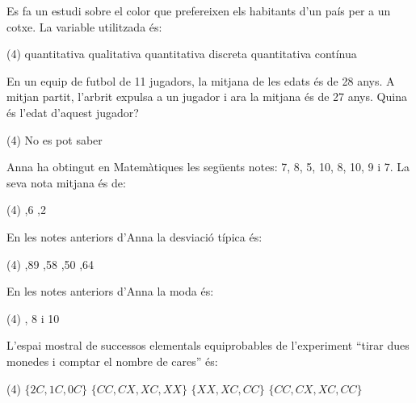 \pagebreak

\begin{autoaval}{51}
\begin{mylist}
 \exer[2] Es fa un estudi sobre el color que prefereixen els habitants d'un país per a un cotxe. La variable utilitzada és:
\begin{tasks}(4)
	\task  quantitativa  
	\task  qualitativa  
	\task  quantitativa discreta  
	\task  quantitativa contínua
\end{tasks}

\exer En un equip de futbol de 11 jugadors, la mitjana de les edats és de 28 anys. A mitjan partit, l'arbrit expulsa a un jugador i ara la mitjana és de 27 anys. Quina és l'edat d'aquest jugador?  
\begin{tasks}(4)
	\task  No es pot saber
\end{tasks}

 \exer Anna ha obtingut en Matemàtiques les següents notes: 7, 8, 5, 10, 8, 10, 9 i 7. La seva nota mitjana és de:
\begin{tasks}(4)
	,6  
	,2  
\end{tasks}

 \exer En les notes anteriors d'Anna la desviació típica és:
\begin{tasks}(4)
	,89 
	,58  
	,50 
	,64
\end{tasks}

 \exer En les notes anteriors d'Anna la moda és:
\begin{tasks}(4)
	, 8 i 10
\end{tasks}

 \exer L'espai mostral de successos elementals equiprobables de l'experiment ``tirar dues monedes i comptar el nombre de cares'' és:
\begin{tasks}(4)
	\task  $\{2C, 1C, 0C\}$  
	\task  $\{CC, CX, XC, XX\}$  
	\task  $\{XX, XC, CC\}$  
	\task  $\{CC, CX, XC, CC\}$
\end{tasks}


\end{mylist}
\end{autoaval}

